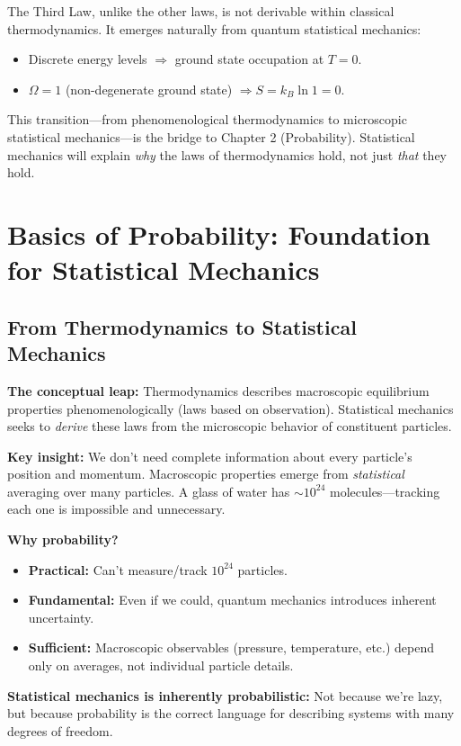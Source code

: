 \documentclass[9pt,twocoloumn]{article}
\begin{document}
The Third Law, unlike the other laws, is not derivable within classical thermodynamics. It emerges naturally from quantum statistical mechanics:
\begin{itemize}
    \item Discrete energy levels $\Rightarrow$ ground state occupation at $T = 0$.
    \item $\Omega = 1$ (non-degenerate ground state) $\Rightarrow S = k_B \ln 1 = 0$.
\end{itemize}

This transition—from phenomenological thermodynamics to microscopic statistical mechanics—is the bridge to Chapter 2 (Probability). Statistical mechanics will explain \emph{why} the laws of thermodynamics hold, not just \emph{that} they hold.

\section{Basics of Probability: Foundation for Statistical Mechanics}

\subsection{From Thermodynamics to Statistical Mechanics}

\textbf{The conceptual leap:} Thermodynamics describes macroscopic equilibrium properties phenomenologically (laws based on observation). Statistical mechanics seeks to \emph{derive} these laws from the microscopic behavior of constituent particles.

\textbf{Key insight:} We don't need complete information about every particle's position and momentum. Macroscopic properties emerge from \emph{statistical} averaging over many particles. A glass of water has $\sim 10^{24}$ molecules—tracking each one is impossible and unnecessary.

\textbf{Why probability?} 
\begin{itemize}
    \item \textbf{Practical:} Can't measure/track $10^{24}$ particles.
    \item \textbf{Fundamental:} Even if we could, quantum mechanics introduces inherent uncertainty.
    \item \textbf{Sufficient:} Macroscopic observables (pressure, temperature, etc.) depend only on averages, not individual particle details.
\end{itemize}

\textbf{Statistical mechanics is inherently probabilistic:} Not because we're lazy, but because probability is the correct language for describing systems with many degrees of freedom.
\end{document}
